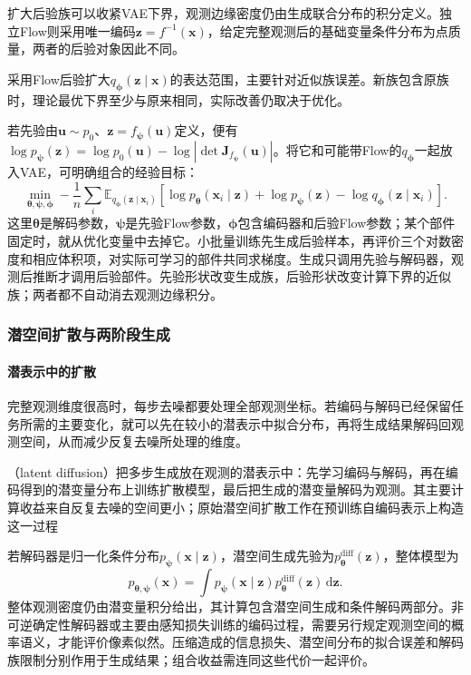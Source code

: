 扩大后验族可以收紧VAE下界，观测边缘密度仍由生成联合分布的积分定义。独立Flow则采用唯一编码$\bm{z}=f^{-1}(\bm{x})$，给定完整观测后的基础变量条件分布为点质量，两者的后验对象因此不同。

采用Flow后验扩大$q_{\bm{\phi}}(\bm{z}\mid\bm{x})$的表达范围，主要针对近似族误差。新族包含原族时，理论最优下界至少与原来相同，实际改善仍取决于优化。

若先验由$\bm u\sim p_0$、$\bm z=f_{\bm\psi}(\bm u)$定义，便有$\log p_{\bm\psi}(\bm z)=\log p_0(\bm u)-\log|\det\bm J_{f_{\bm\psi}}(\bm u)|$。将它和可能带Flow的$q_{\bm\phi}$一起放入VAE，可明确组合的经验目标：
\begin{equation}
  \label{eq:pgm-generative-flow-components-objective}
  \min_{\bm\theta,\bm\psi,\bm\phi}
  -\frac1n\sum_i\mathbb E_{q_{\bm\phi}(\bm z\mid\bm x_i)}
  \left[\log p_{\bm\theta}(\bm x_i\mid\bm z)
       +\log p_{\bm\psi}(\bm z)
       -\log q_{\bm\phi}(\bm z\mid\bm x_i)\right].
\end{equation}
这里$\bm\theta$是解码参数，$\bm\psi$是先验Flow参数，$\bm\phi$包含编码器和后验Flow参数；某个部件固定时，就从优化变量中去掉它。小批量训练先生成后验样本，再评价三个对数密度和相应体积项，对实际可学习的部件共同求梯度。生成只调用先验与解码器，观测后推断才调用后验部件。先验形状改变生成族，后验形状改变计算下界的近似族；两者都不自动消去观测边缘积分。

\subsubsection{潜空间扩散与两阶段生成}

\paragraph{潜表示中的扩散}

完整观测维度很高时，每步去噪都要处理全部观测坐标。若编码与解码已经保留任务所需的主要变化，就可以先在较小的潜表示中拟合分布，再将生成结果解码回观测空间，从而减少反复去噪所处理的维度。

（latent diffusion）把多步生成放在观测的潜表示中：先学习编码与解码，再在编码得到的潜变量分布上训练扩散模型，最后把生成的潜变量解码为观测。其主要计算收益来自反复去噪的空间更小；原始潜空间扩散工作在预训练自编码表示上构造这一过程

若解码器是归一化条件分布$p_{\bm{\psi}}(\bm{x}\mid\bm{z})$，潜空间生成先验为$p_{\bm{\theta}}^{\mathrm{diff}}(\bm{z})$，整体模型为
\begin{equation}
  \label{eq:pgm-generative-latent-diffusion}
  p_{\bm{\theta},\bm{\psi}}(\bm{x})
  =\int p_{\bm{\psi}}(\bm{x}\mid\bm{z})
          p_{\bm{\theta}}^{\mathrm{diff}}(\bm{z})\,\mathrm{d}\bm{z}.
\end{equation}
整体观测密度仍由潜变量积分给出，其计算包含潜空间生成和条件解码两部分。非可逆确定性解码器或主要由感知损失训练的编码过程，需要另行规定观测空间的概率语义，才能评价像素似然。压缩造成的信息损失、潜空间分布的拟合误差和解码族限制分别作用于生成结果；组合收益需连同这些代价一起评价。


